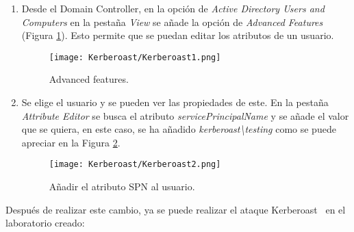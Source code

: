 \begin{enumerate}

\item Desde el Domain Controller, en la opción de {\it Active Directory Users and Computers} en la pestaña {\it View} se añade la opción de {\it Advanced Features} (Figura \ref{Kerberoast1}). Esto permite que se puedan editar los atributos de un usuario. 
\begin{figure}[H] %
\begin{center}
\texttt{[image: Kerberoast/Kerberoast1.png]}
\end{center}
\caption{Advanced features.}
\label{Kerberoast1}
\end{figure}

\item Se elige el usuario y se pueden ver las propiedades de este. En la pestaña {\it Attribute Editor} se busca el atributo {\it servicePrincipalName} y se añade el valor que se quiera, en este caso, se ha añadido {\it kerberoast\textbackslash{}testing} como se puede apreciar en la Figura \ref{Kerberoast2}.
\begin{figure}[H] %
\begin{center}
\texttt{[image: Kerberoast/Kerberoast2.png]}
\end{center}
\caption{Añadir el atributo SPN al usuario.}
\label{Kerberoast2}
\end{figure}

\end{enumerate}

Después de realizar este cambio, ya se puede realizar el ataque Kerberoast~\cite{Capitulo5:Kerberoast} en el laboratorio creado: 

